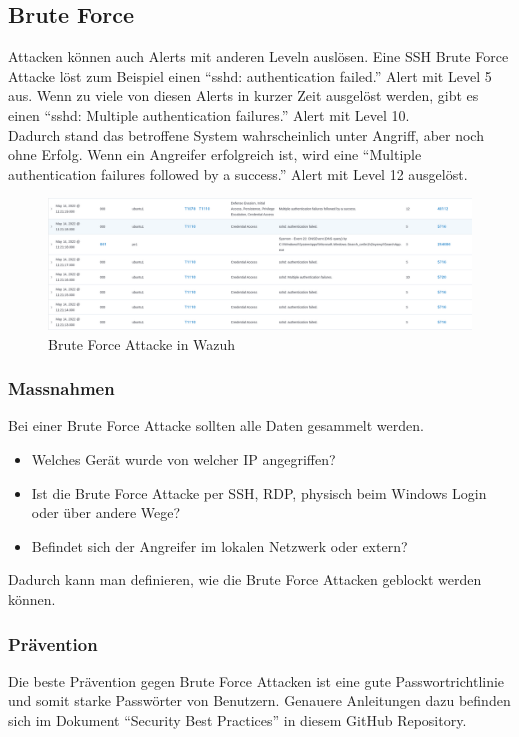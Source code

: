 \subsection{Brute Force}
Attacken können auch Alerts mit anderen Leveln auslösen. 
Eine SSH Brute Force Attacke löst zum Beispiel einen ``sshd: authentication failed.'' Alert mit Level 5 aus.
Wenn zu viele von diesen Alerts in kurzer Zeit ausgelöst werden, gibt es einen ``sshd: Multiple authentication failures.'' Alert mit Level 10.\\

Dadurch stand das betroffene System wahrscheinlich unter Angriff, aber noch ohne Erfolg.
Wenn ein Angreifer erfolgreich ist, wird eine ``Multiple authentication failures followed by a success.'' Alert mit Level 12 ausgelöst.
\begin{figure}[H]
    \centering
    \includegraphics[width=\linewidth]{../img/brute-force.png}
    \caption{Brute Force Attacke in Wazuh}
\end{figure}

\subsubsection{Massnahmen}
Bei einer Brute Force Attacke sollten alle Daten gesammelt werden.
\begin{itemize}
    \item Welches Gerät wurde von welcher IP angegriffen?
    \item Ist die Brute Force Attacke per SSH, RDP, physisch beim Windows Login oder über andere Wege? 
    \item Befindet sich der Angreifer im lokalen Netzwerk oder extern?
\end{itemize}

Dadurch kann man definieren, wie die Brute Force Attacken geblockt werden können.

\subsubsection{Prävention}
Die beste Prävention gegen Brute Force Attacken ist eine gute Passwortrichtlinie und somit starke Passwörter von Benutzern.
Genauere Anleitungen dazu befinden sich im Dokument ``Security Best Practices'' in diesem GitHub Repository.

